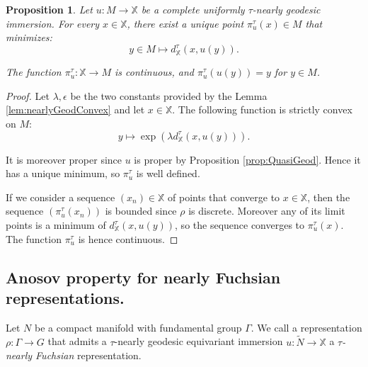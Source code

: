 \documentclass[reqno,10pt]{amsart}
\theoremstyle{plain}
\newtheorem{prop}[thm]{Proposition}
\theoremstyle{definition}
\theoremstyle{remark}
\newcommand{\type}{\tau}
\newcommand{\X}{\mathbb{X}}
\begin{document}
\begin{prop}
\label{prop:ProjectionFinsler}
Let $u:M\to \X$ be a complete uniformly $\type$-nearly geodesic immersion. For every $x\in \X$, there exist a unique point $\pi^\type_u(x)\in M$ that minimizes:
$$y\in M\mapsto d^\type_\X(x,u(y)).$$

The function $\pi^\type_u:\X\to M$ is continuous, and $\pi^\type_u(u(y))=y$ for $y\in M$.
\end{prop}

\begin{proof}
Let $\lambda,\epsilon$ be the two constants provided by the Lemma \ref{lem:nearlyGeodConvex} and let $x\in\X$. The following function is strictly convex on $M$: 
$$y\mapsto\exp\left(\lambda d^\type_\X(x,u(y))\right).$$

It is moreover proper since $u$ is proper by Proposition \ref{prop:QuasiGeod}. Hence it has a unique minimum, so $\pi^\type_u$ is well defined. 

\medskip

If we consider a sequence $(x_n)\in \X$ of points that converge to $x\in \X$, then the sequence $(\pi^\type_u(x_n))$ is bounded since $\rho$ is discrete. Moreover any of its limit points is a minimum of $d^\type_\X(x,u(y))$, so the sequence converges to $\pi^\type_u(x)$. The function $\pi^\type_u$ is hence continuous.
\end{proof}
\subsection{Anosov property for nearly Fuchsian representations.}
\label{sec:AnosovNearlyFuch}
Let $N$ be a compact manifold with fundamental group $\Gamma$. 
We call a representation $\rho:\Gamma\to G$ that admits a $\type$-nearly geodesic equivariant immersion $u:\widetilde{N}\to \X$ a \emph{$\type$-nearly Fuchsian} representation. 
\end{document}
